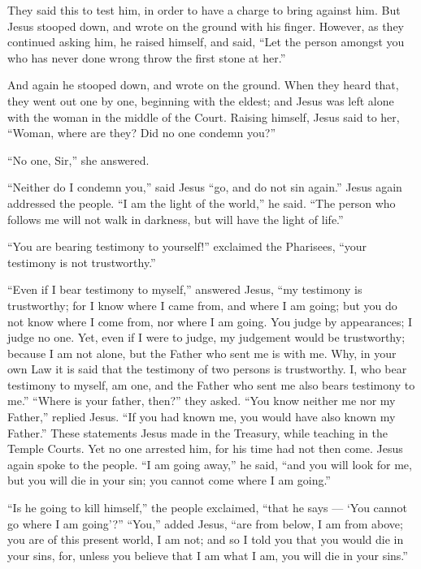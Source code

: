  They said this to test him, in order to have a charge to
bring against him. But Jesus stooped down, and wrote on the ground with
his finger.  However, as they continued asking him, he
raised himself, and said, ``Let the person amongst you who has never
done wrong throw the first stone at her.''

 And again he stooped down, and wrote on the ground.
 When they heard that, they went out one by one, beginning
with the eldest; and Jesus was left alone with the woman in the middle
of the Court.  Raising himself, Jesus said to her, ``Woman,
where are they? Did no one condemn you?''

 ``No one, Sir,'' she answered.

``Neither do I condemn you,'' said Jesus ``go, and do not sin again.''
 Jesus again addressed the people. ``I am the light of the
world,'' he said. ``The person who follows me will not walk in darkness,
but will have the light of life.''

 ``You are bearing testimony to yourself!'' exclaimed the
Pharisees, ``your testimony is not trustworthy.''

 ``Even if I bear testimony to myself,'' answered Jesus,
``my testimony is trustworthy; for I know where I came from, and where I
am going; but you do not know where I come from, nor where I am going.
 You judge by appearances; I judge no one. 
Yet, even if I were to judge, my judgement would be trustworthy; because
I am not alone, but the Father who sent me is with me. 
Why, in your own Law it is said that the testimony of two persons is
trustworthy.  I, who bear testimony to myself, am one, and
the Father who sent me also bears testimony to me.'' 
``Where is your father, then?'' they asked. ``You know neither me nor my
Father,'' replied Jesus. ``If you had known me, you would have also
known my Father.''  These statements Jesus made in the
Treasury, while teaching in the Temple Courts. Yet no one arrested him,
for his time had not then come.  Jesus again spoke to the
people. ``I am going away,'' he said, ``and you will look for me, but
you will die in your sin; you cannot come where I am going.''

 ``Is he going to kill himself,'' the people exclaimed,
``that he says --- `You cannot go where I am going'?'' 
``You,'' added Jesus, ``are from below, I am from above; you are of this
present world, I am not;  and so I told you that you would
die in your sins, for, unless you believe that I am what I am, you will
die in your sins.''

